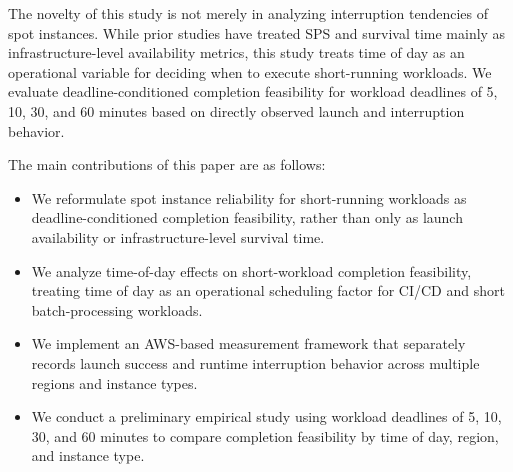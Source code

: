 \documentclass[runningheads]{llncs}
\begin{document}
The novelty of this study is not merely in analyzing interruption tendencies of spot instances. While prior studies have treated SPS and survival time mainly as infrastructure-level availability metrics, this study treats time of day as an operational variable for deciding when to execute short-running workloads. We evaluate deadline-conditioned completion feasibility for workload deadlines of 5, 10, 30, and 60 minutes based on directly observed launch and interruption behavior.

The main contributions of this paper are as follows:
\begin{itemize}
    \item We reformulate spot instance reliability for short-running workloads as deadline-conditioned completion feasibility, rather than only as launch availability or infrastructure-level survival time.
    \item We analyze time-of-day effects on short-workload completion feasibility, treating time of day as an operational scheduling factor for CI/CD and short batch-processing workloads.
    \item We implement an AWS-based measurement framework that separately records launch success and runtime interruption behavior across multiple regions and instance types.
    \item We conduct a preliminary empirical study using workload deadlines of 5, 10, 30, and 60 minutes to compare completion feasibility by time of day, region, and instance type.
\end{itemize}


\end{document}
